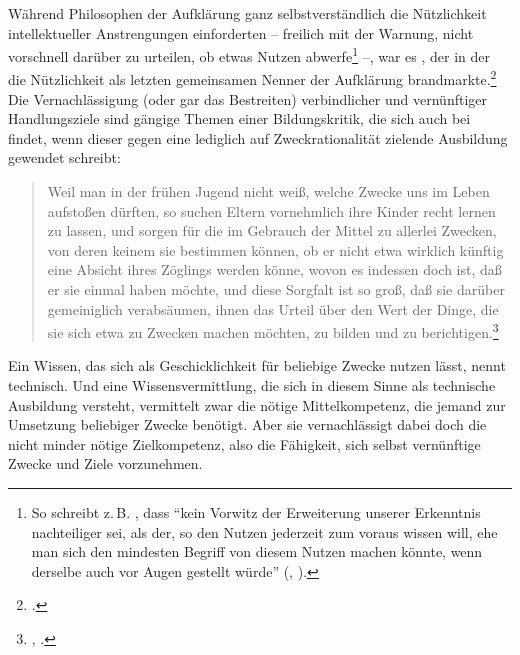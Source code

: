 \label{Abschnitt:AufklaerungunddieNuetzlichkeit}
Während Philosophen der Aufklärung ganz selbstverständlich die Nützlichkeit
intellektueller Anstrengungen einforderten -- freilich mit der Warnung, nicht
vorschnell darüber zu urteilen, ob etwas Nutzen abwerfe\footnote{So schreibt
{z.\,B.} , dass \enquote{kein Vorwitz der Erweiterung unserer
Erkenntnis nachteiliger sei, als der, so den Nutzen jederzeit zum voraus wissen
will, ehe man sich den mindesten Begriff von diesem Nutzen machen könnte, wenn
derselbe auch vor Augen gestellt würde}
\mkbibparens{\cite[][B 296]{Kant:KritikderreinenVernunft2003}, \cite[][III:
203.25--29]{Kant:GesammelteWerke1900ff.}}.} --, war es
, der in der  die Nützlichkeit als letzten gemeinsamen Nenner der Aufklärung
brandmarkte.\footnote{\cite[Vgl.][IX: 310.22--315.11]{Hegel:GesammelteWerke}.} Die
Vernachlässigung (oder gar das Bestreiten) verbindlicher  und
vernünftiger Handlungsziele sind gängige Themen einer Bildungskritik, die sich
auch bei  findet, wenn dieser gegen eine lediglich auf
Zweckrationalität zielende Ausbildung gewendet schreibt:
\begin{quote}
  Weil man in der frühen Jugend nicht weiß, welche Zwecke uns im Leben aufstoßen
  dürften, so suchen Eltern vornehmlich ihre Kinder recht  lernen
  zu lassen, und sorgen für die  im Gebrauch der Mittel zu
  allerlei  Zwecken, von deren keinem sie bestimmen können, ob
  er nicht etwa wirklich künftig eine Absicht ihres Zöglings werden könne, wovon
  es indessen doch  ist, daß er sie einmal haben möchte, und diese
  Sorgfalt ist so groß, daß sie darüber gemeiniglich verabsäumen, ihnen das
  Urteil über den Wert der Dinge, die sie sich etwa zu Zwecken machen möchten,
  zu bilden und zu
  berichtigen.\footnote{\cite[BA~41--2]{Kant:GrundlegungzurMetaphysikderSitten1965},
  \cite[IV: 415.20--17]{Kant:GesammelteWerke1900ff.}.}
\end{quote}
Ein Wissen, das sich als Geschicklichkeit für beliebige Zwecke nutzen lässt,
nennt  technisch. Und eine Wissensvermittlung, die sich in diesem
Sinne als technische Ausbildung versteht, vermittelt zwar die nötige
Mittelkompetenz, die jemand zur Umsetzung beliebiger Zwecke benötigt. Aber sie vernachlässigt
dabei doch die nicht minder nötige Zielkompetenz, also die Fähigkeit, sich
selbst vernünftige Zwecke und Ziele vorzunehmen.

